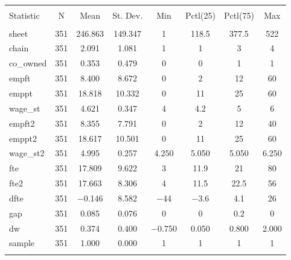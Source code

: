 
\begin{table}[!htbp] \centering 
  \caption{} 
  \label{} 
\begin{tabular}{@{\extracolsep{5pt}}lccccccc} 
\\[-1.8ex]\hline 
\hline \\[-1.8ex] 
Statistic & \multicolumn{1}{c}{N} & \multicolumn{1}{c}{Mean} & \multicolumn{1}{c}{St. Dev.} & \multicolumn{1}{c}{Min} & \multicolumn{1}{c}{Pctl(25)} & \multicolumn{1}{c}{Pctl(75)} & \multicolumn{1}{c}{Max} \\ 
\hline \\[-1.8ex] 
sheet & 351 & 246.863 & 149.347 & 1 & 118.5 & 377.5 & 522 \\ 
chain & 351 & 2.091 & 1.081 & 1 & 1 & 3 & 4 \\ 
co\_owned & 351 & 0.353 & 0.479 & 0 & 0 & 1 & 1 \\ 
empft & 351 & 8.400 & 8.672 & 0 & 2 & 12 & 60 \\ 
emppt & 351 & 18.818 & 10.332 & 0 & 11 & 25 & 60 \\ 
wage\_st & 351 & 4.621 & 0.347 & 4 & 4.2 & 5 & 6 \\ 
empft2 & 351 & 8.355 & 7.791 & 0 & 2 & 12 & 40 \\ 
emppt2 & 351 & 18.617 & 10.501 & 0 & 11 & 25 & 60 \\ 
wage\_st2 & 351 & 4.995 & 0.257 & 4.250 & 5.050 & 5.050 & 6.250 \\ 
fte & 351 & 17.809 & 9.622 & 3 & 11.9 & 21 & 80 \\ 
fte2 & 351 & 17.663 & 8.306 & 4 & 11.5 & 22.5 & 56 \\ 
dfte & 351 & $-$0.146 & 8.582 & $-$44 & $-$3.6 & 4.1 & 26 \\ 
gap & 351 & 0.085 & 0.076 & 0 & 0 & 0.2 & 0 \\ 
dw & 351 & 0.374 & 0.400 & $-$0.750 & 0.050 & 0.800 & 2.000 \\ 
sample & 351 & 1.000 & 0.000 & 1 & 1 & 1 & 1 \\ 
\hline \\[-1.8ex] 
\end{tabular} 
\end{table} 
